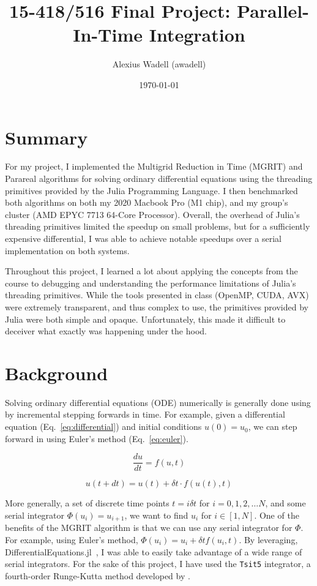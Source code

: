 \documentclass{article}
\title{15-418/516 Final Project: Parallel-In-Time Integration}
\author{Alexius Wadell (awadell)}
\date{\today}
\begin{document}
\maketitle

\section{Summary}
For my project, I implemented the Multigrid Reduction in Time (MGRIT) and Parareal algorithms for solving ordinary differential equations using the threading primitives provided by the Julia Programming Language.
I then benchmarked both algorithms on both my 2020 Macbook Pro (M1 chip), and my group's cluster (AMD EPYC 7713 64-Core Processor).
Overall, the overhead of Julia's threading primitives limited the speedup on small problems, but for a sufficiently expensive differential, I was able to achieve notable speedups over a serial implementation on both systems.

Throughout this project, I learned a lot about applying the concepts from the course to debugging and understanding the performance limitations of Julia's threading primitives.
While the tools presented in class (OpenMP, CUDA, AVX) were extremely transparent, and thus complex to use, the primitives provided by Julia were both simple and opaque.
Unfortunately, this made it difficult to deceiver what exactly was happening under the hood.

\section{Background}

Solving ordinary differential equations (ODE) numerically is generally done using by incremental stepping forwards in time.
For example, given a differential equation (Eq.~\ref{eq:differential}) and initial conditions \( u(0) = u_0 \), we can step forward in using Euler's method (Eq.~\ref{eq:euler}).

\begin{equation}\label{eq:differential}
    \frac{du}{dt} = f(u, t)
\end{equation}

\begin{equation}\label{eq:euler}
    u(t + dt) = u(t) + \delta t \cdot f(u(t), t)
\end{equation}

More generally, a set of discrete time points \( t = i \delta t \) for \( i = 0,1,2,\dots N\), and some serial integrator \( \Phi(u_i) = u_{i+1} \), we want to find \( u_i\) for \( i \in [1, N] \).
One of the benefits of the MGRIT algorithm is that we can use any serial integrator for \(\Phi\).
For example, using Euler's method, \( \Phi(u_i) = u_i + \delta t f(u_i, t) \).
By leveraging, DifferentialEquations.jl~\cite{rackauckasDifferentialEquationsJlPerformant2017a}, I was able to easily take advantage of a wide range of serial integrators.
For the sake of this project, I have used the \verb!Tsit5! integrator, a fourth-order Runge-Kutta method developed by \citeauthor{tsitouras2011runge}.
\end{document}
